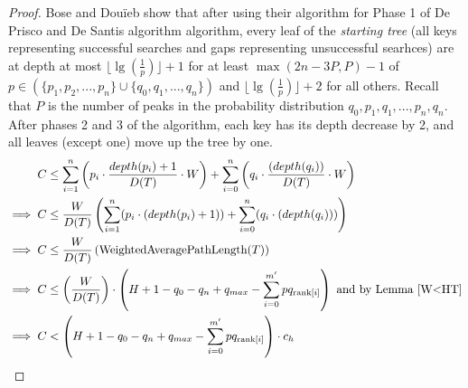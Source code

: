 \documentclass[]{beamer}
\theoremstyle{plain}
\begin{document}
\begin{frame}
\begin{proof}

Bose and Dou\"{i}eb show that after using their algorithm for Phase 1 of De Prisco and De Santis algorithm algorithm, every leaf of the \textit{starting tree} (all keys representing successful searches and gaps representing unsuccessful searhces) are at depth at most $\lfloor \lg(\frac{1}{p}) \rfloor + 1$  for at least $\max(2n-3P,P)-1$ of $p \in \left( \{p_1, p_2, ..., p_n \} \cup \{ q_0, q_1, ..., q_n \} \right)$ and $\lfloor \lg(\frac{1}{p}) \rfloor + 2$ for all others. Recall that $P$ is the number of peaks in the probability distribution $q_0, p_1, q_1, ..., p_n, q_n$. After phases 2 and 3 of the algorithm, each key has its depth decrease by 2, and all leaves (except one) move up the tree by one.
\begin{align*}
C &\leq \sum_{i=1}^{n} \left(p_i\cdot \frac{depth(p_i)+1}{D(T)}\cdot  W \right)+ \sum_{i=0}^{n} \left(q_i\cdot \frac{(depth(q_i))}{D(T)}\cdot  W \right) \\
\implies C &\leq \frac{W}{D(T)} \left(\sum_{i=1}^{n}(p_i\cdot (depth(p_i)+1))+ \sum_{i=0}^{n}(q_i\cdot (depth(q_i))) \right) \\
\implies C &\leq \frac{W}{D(T)} \left(\text{WeightedAveragePathLength}(T) \right) \\
\implies C &\leq  \left( \frac{W}{D(T)} \right) \cdot  \left(H + 1 - q_0 - q_n + q_{max} - \sum_{i=0}^{m'} pq_{\text{rank}[i]} \right) \text{ and by Lemma~\ref{W<HT}} \\
\implies C &<  \left(H + 1 - q_0 - q_n + q_{max} - \sum_{i=0}^{m'} pq_{\text{rank}[i]} \right)\cdot c_h
\end{align*}

\end{proof}
\end{frame}
\end{document}
